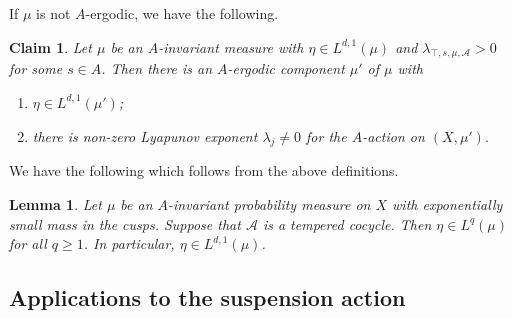 \documentclass[10pt,reqno]{amsart}
\theoremstyle{Theorem}
\newtheorem{claim}[theorem]{Claim}
\newtheorem{lemma}[theorem]{Lemma}
\theoremstyle{definition}
\theoremstyle{remark}
\def\calA{\mathcal A}
\begin{document}
If $\mu$ is not $A$-ergodic, we have the following.
\begin{claim} \label{claim:defenestratethepresident}
Let $\mu$ be an $A$-invariant measure with $\eta\in L^{d,1}(\mu)$ and $\lambda_{\top, s, \mu,\calA}>0$ for some $s\in A$. Then there is an $A$-ergodic component $\mu'$ of $\mu$ with
\begin{enumerate}
\item $\eta\in L^{d,1}(\mu')$;
\item there is non-zero   Lyapunov exponent $\lambda_j\neq 0$ for the $A$-action on $(X, \mu').$
\end{enumerate}
\end{claim}



We have the following which follows from the above definitions.
\begin{lemma}\label{lem:huntthelameduck}
Let $\mu$ be an $A$-invariant  probability  measure on $X$ with exponentially small mass in the cusps.
Suppose that $\calA$ is a tempered cocycle.
Then $\eta\in L^q(\mu)$ for all $q\ge 1$.   In particular, $\eta\in L^{d,1}(\mu)$.
\end{lemma}
%




\subsection{Applications to the suspension action}
\label{subsection:repackagingpreliminaries}
\end{document}
